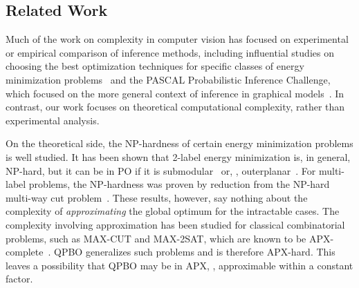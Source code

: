 \subsection{Related Work}\label{sec:related}

%

Much of the work on complexity in computer vision has focused on experimental or empirical comparison of inference methods, including influential studies on choosing the best optimization techniques for specific classes of energy minimization problems~\cite{Szeliski08-PAMI,kappes2015comparative} and the PASCAL Probabilistic Inference Challenge, which focused on the more general context of inference in graphical models~\cite{PIC}. In contrast, our work focuses on theoretical computational complexity, rather than experimental analysis.

On the theoretical side, the NP-hardness of certain energy minimization problems is well studied. It has been shown that 2-label energy minimization is, in general, NP-hard, but it can be in PO if it is submodular~\cite{Kolmogorov02:regular-pami} or, \eg, outerplanar~\cite{Schraudolph-10}. For multi-label problems, the NP-hardness was proven by reduction from the NP-hard multi-way cut problem~\cite{boykov2001approximate}. These results, however, say nothing about the complexity of {\em approximating} the global optimum for the intractable cases. The complexity involving approximation has been studied for classical combinatorial problems, such as MAX-CUT and MAX-2SAT, which are known to be APX-complete~\cite{Papadimitriou-91}. QPBO generalizes such problems and is therefore APX-hard. This leaves a possibility that QPBO may be in APX, \ie, approximable within a constant factor.



